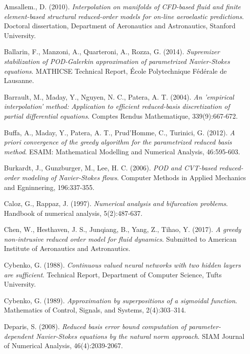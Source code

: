 \documentclass[12pt, a4paper, twoside, openright]{report}
\numberwithin{equation}{chapter}
\theoremstyle{theorem}
\theoremstyle{definition}
\theoremstyle{remark}
\theoremstyle{proposition}
\numberwithin{figure}{chapter}
\begin{document}
		
	\begin{thebibliography}{50}
	
		Amsallem., D. (2010). \emph{Interpolation on manifolds of CFD-based fluid and finite element-based structural reduced-order models for on-line aeroelastic predictions}. Doctoral dissertation, Department of Aeronautics and Astronautics, Stanford University.
		
		Ballarin, F., Manzoni, A., Quarteroni, A., Rozza, G. (2014). \emph{Supremizer stabilization of POD-Galerkin approximation of parametrized Navier-Stokes equations}. MATHICSE Technical Report, \'Ecole Polytechnique F\'ed\'erale de Lausanne.
	
		Barrault, M., Maday, Y., Nguyen, N. C., Patera, A. T. (2004). \emph{An 'empirical interpolation' method: Application to efficient reduced-basis discretization of partial differential equations}. Comptes Rendus Mathematique, 339(9):667-672.
		
		Buffa, A., Maday, Y., Patera, A. T., Prud'Homme, C., Turinici, G. (2012). \emph{A priori convergence of the greedy algorithm for the parametrized reduced basis method}. ESAIM: Mathematical Modelling and Numerical Analysis, 46:595-603.
		
		Burkardt, J., Gunzburger, M., Lee, H. C. (2006). \emph{POD and CVT-based reduced-order modeling of Navier-Stokes flows}. Computer Methods in Applied Mechanics and Egninnering, 196:337-355.
		
		Caloz, G., Rappaz, J. (1997). \emph{Numerical analysis and bifurcation problems}. Handbook of numerical analysis, 5(2):487-637.
		
		Chen, W., Hesthaven, J. S., Junqiang, B., Yang, Z., Tihao, Y. (2017). \emph{A greedy non-intrusive reduced order model for fluid dynamics}. Submitted to American Institute of Aeronautics and Astronautics.
	
		Cybenko, G. (1988). \emph{Continuous valued neural networks with two hidden layers are sufficient}. Technical Report, Department of Computer Science, Tufts University.
		
		Cybenko, G. (1989). \emph{Approximation by superpositions of a sigmoidal function}. Mathematics of Control, Signals, and Systems, 2(4):303–314.
		
		Deparis, S. (2008). \emph{Reduced basis error bound computation of parameter-dependent Navier-Stokes equations by the natural norm approach}. SIAM Journal of Numerical Analysis, 46(4):2039-2067.
		

\end{thebibliography}
\end{document}
